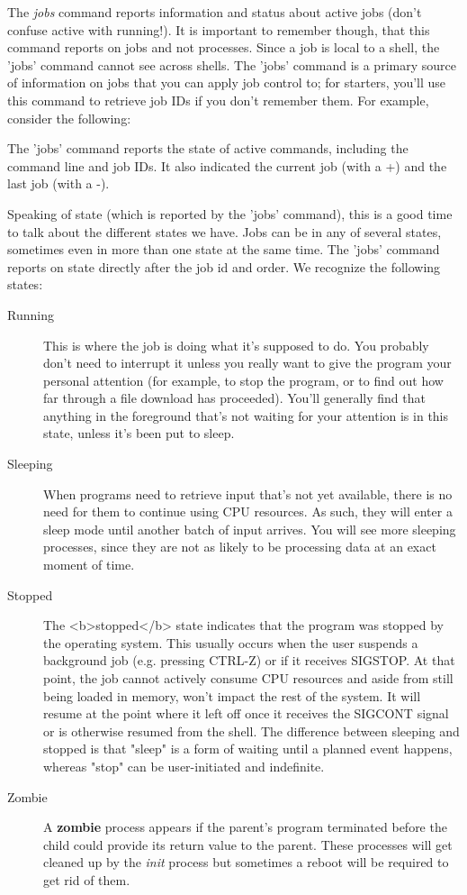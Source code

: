The \textit{jobs} command reports information and status about active jobs
(don't confuse active with running!). It is important to remember though, that
this command reports on jobs and not processes. Since a job is local to a
shell, the 'jobs' command cannot see across shells. The 'jobs' command is a
primary source of information on jobs that you can apply job control to; for
starters, you'll use this command to retrieve job IDs if you don't remember
them. For example, consider the following:

The 'jobs' command reports the state of active commands, including the command
line and job IDs. It also indicated the current job (with a +) and the last job
(with a -).

Speaking of state (which is reported by the 'jobs' command), this is a good
time to talk about the different states we have. Jobs can be in any of several
states, sometimes even in more than one state at the same time. The 'jobs'
command reports on state directly after the job id and order. We recognize the
following states:

\begin{description}
\item[Running] This is where the job is doing what it's supposed to do. You
probably don't need to interrupt it unless you really want to give the program
your personal attention (for example, to stop the program, or to find out how
far through a file download has proceeded). You'll generally find that anything
in the foreground that's not waiting for your attention is in this state,
unless it's been put to sleep.
\item[Sleeping] When programs need to retrieve input that's not yet available,
there is no need for them to continue using CPU resources. As such, they will
enter a sleep mode until another batch of input arrives. You will see more
sleeping processes, since they are not as likely to be processing data at an
exact moment of time.  
\item[Stopped] The <b>stopped</b> state indicates that the program was stopped
by the operating system.  This usually occurs when the user suspends a
background job (e.g. pressing CTRL-Z) or if it receives SIGSTOP.  At that
point, the job cannot actively consume CPU resources and aside from still being
loaded in memory, won't impact the rest of the system.  It will resume at the
point where it left off once it receives the SIGCONT signal or is otherwise
resumed from the shell. The difference between sleeping and stopped is that
"sleep" is a form of waiting until a planned event happens, whereas "stop" can
be user-initiated and indefinite.
\item[Zombie] A \textbf{zombie} process appears if the parent's program
terminated before the child could provide its return value to the parent.
These processes will get cleaned up by the \textit{init} process but sometimes
a reboot will be required to get rid of them.
\end{description}

